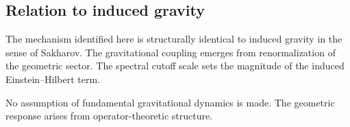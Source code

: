 \subsection{Relation to induced gravity}
  \label{subsec:induced-gravity}

  The mechanism identified here is structurally identical to
  induced gravity in the sense of Sakharov.
  The gravitational coupling emerges from renormalization of the
  geometric sector.
  The spectral cutoff scale sets the magnitude of the induced
  Einstein--Hilbert term.

  No assumption of fundamental gravitational dynamics is made.
  The geometric response arises from operator-theoretic structure.
